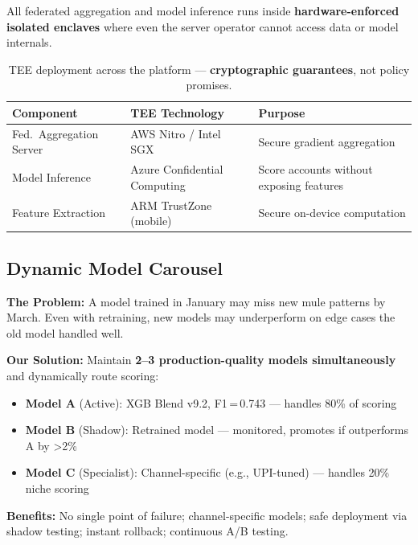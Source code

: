 \documentclass[11pt, a4paper]{article}
\begin{document}
All federated aggregation and model inference runs inside \textbf{hardware-enforced isolated enclaves} where even the server operator cannot access data or model internals.

\begin{table}[H]
\centering
\small
{}
\begin{tabularx}{\textwidth}{L{4.5cm} L{5cm} X}
\toprule
{}
\textbf{Component} & \textbf{TEE Technology} & \textbf{Purpose} \\
\midrule
Fed.\ Aggregation Server & AWS Nitro / Intel SGX & Secure gradient aggregation \\
Model Inference & Azure Confidential Computing & Score accounts without exposing features \\
Feature Extraction & ARM TrustZone (mobile) & Secure on-device computation \\
\bottomrule
\end{tabularx}
\caption{TEE deployment across the platform --- \textbf{cryptographic guarantees}, not policy promises.}
\end{table}


\subsection{Dynamic Model Carousel}

\textbf{The Problem:} A model trained in January may miss new mule patterns by March. Even with retraining, new models may underperform on edge cases the old model handled well.

\textbf{Our Solution:} Maintain \textbf{2--3 production-quality models simultaneously} and dynamically route scoring:

\begin{itemize}
    \item \textbf{Model A} (Active): XGB Blend v9.2, F1\,=\,0.743 --- handles 80\% of scoring
    \item \textbf{Model B} (Shadow): Retrained model --- monitored, promotes if outperforms A by {>}2\%
    \item \textbf{Model C} (Specialist): Channel-specific (e.g., UPI-tuned) --- handles 20\% niche scoring
\end{itemize}

\textbf{Benefits:} No single point of failure; channel-specific models; safe deployment via shadow testing; instant rollback; continuous A/B testing.
\end{document}
